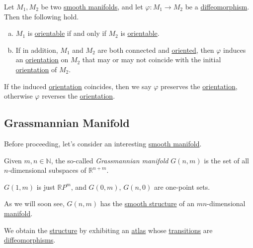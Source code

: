 Let \(M_1, M_2\) be two \hyperref[def:smooth-manifold]{smooth manifolds}, and let \(\varphi \colon M_1 \to M_2\) be a \hyperref[def:diffeomorphism]{diffeomorphism}. Then the following hold.
\begin{enumerate}[(a)]
	\item \(M_1\) is \hyperref[def:orientable]{orientable} if and only if \(M_2\) is \hyperref[def:orientable]{orientable}.
	\item If in addition, \(M_1\) and \(M_2\) are both connected and \hyperref[def:oriented]{oriented}, then \(\varphi \) induces an \hyperref[def:orientation]{orientation} on \(M_2\) that may or may not coincide with the initial \hyperref[def:orientation]{orientation} of \(M_2\).
\end{enumerate}

If the induced \hyperref[def:orientation]{orientation} coincides, then we say \(\varphi \) preserves the \hyperref[def:orientation]{orientation}, otherwise \(\varphi \) reverses the \hyperref[def:orientation]{orientation}.

\subsection{Grassmannian Manifold}
Before proceeding, let's consider an interesting \hyperref[def:smooth-manifold]{smooth manifold}.

\begin{definition}\label{def:Grassmannian-manifold}
	Given \(m, n\in \mathbb{N} \), the so-called \emph{Grassmannian manifold} \(G(n, m)\) is the set of all \(n\)-dimensional subspaces of \(\mathbb{R} ^{n+m}\).
\end{definition}

\begin{note}
	\(G(1, m)\) is just \(\mathbb{R} P^m\), and \(G(0, m)\), \(G(n, 0)\) are one-point sets.
\end{note}

As we will soon see, \(G(n, m)\) has the \hyperref[def:smooth-structure]{smooth structure} of an \(mn\)-dimensional \hyperref[def:smooth-manifold]{manifold}.

\begin{intuition}
	We obtain the \hyperref[def:smooth-structure]{structure} by exhibiting an \hyperref[def:atlas]{atlas} whose \hyperref[def:coordinate-transition]{transitions} are \hyperref[def:diffeomorphism]{diffeomorphisms}.
\end{intuition}


